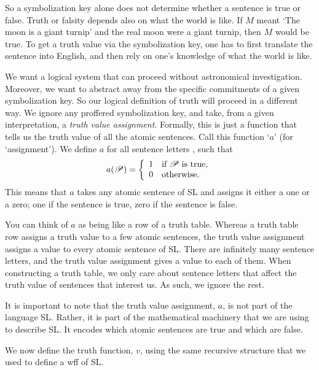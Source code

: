 So a symbolization key alone does not determine whether a sentence is true or false. Truth or falsity depends also on what the world is like. If $M$ meant `The moon is a giant turnip' and the real moon were a giant turnip, then $M$ would be true. To get a truth value via the symbolization key, one has to first translate the sentence into English, and then rely on one's knowledge of what the world is like.

We want a logical system that can proceed without astronomical investigation. Moreover, we want to abstract away from the specific commitments of a given symbolization key. So our logical definition of truth will proceed in a different way. We ignore any proffered symbolization key, and take, from a given interpretation, a \emph{truth value assignment}. Formally, this is just a function that tells us the truth value of all the atomic sentences. Call this function `$a$' (for `assignment'). We define $a$ for all sentence letters , such that
\begin{displaymath}
a(\mathscr{P}) =
\left\{
	\begin{array}{ll}
	1 & \mbox{if \ensuremath{\mathscr{P}} is true},\\
	0 & \mbox{otherwise.}
	\end{array}
\right.
\end{displaymath}
This means that $a$ takes any atomic sentence of SL and assigns it either a one or a zero; one if the sentence is true, zero if the sentence is false. 

You can think of $a$ as being like a row of a truth table. Whereas a truth table row assigns a truth value to a few atomic sentences, the truth value assignment assigns a value to every atomic sentence of SL. There are infinitely many sentence letters, and the truth value assignment gives a value to each of them. When constructing a truth table, we only care about sentence letters that affect the truth value of sentences that interest us. As such, we ignore the rest.

It is important to note that the truth value assignment, $a$, is not part of the language SL. Rather, it is part of the mathematical machinery that we are using to describe SL. It encodes which atomic sentences are true and which are false.


We now define the truth function, $v$, using the same recursive structure that we used to define a wff of SL.

